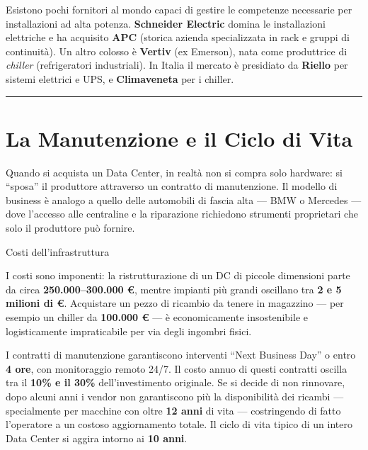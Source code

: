 \documentclass[
  italian,
  openany]{book}
\begin{document}
Esistono pochi fornitori al mondo capaci di gestire le competenze
necessarie per installazioni ad alta potenza. \textbf{Schneider
Electric} domina le installazioni elettriche e ha acquisito \textbf{APC}
(storica azienda specializzata in rack e gruppi di continuità). Un altro
colosso è \textbf{Vertiv} (ex Emerson), nata come produttrice di
\emph{chiller} (refrigeratori industriali). In Italia il mercato è
presidiato da \textbf{Riello} per sistemi elettrici e UPS, e
\textbf{Climaveneta} per i chiller.

\begin{center}\rule{0.5\linewidth}{0.5pt}\end{center}

\section{La Manutenzione e il Ciclo di
Vita}\label{la-manutenzione-e-il-ciclo-di-vita}

Quando si acquista un Data Center, in realtà non si compra solo
hardware: si ``sposa'' il produttore attraverso un contratto di
manutenzione. Il modello di business è analogo a quello delle automobili
di fascia alta --- BMW o Mercedes --- dove l'accesso alle centraline e
la riparazione richiedono strumenti proprietari che solo il produttore
può fornire.

\begin{calloutwarning}{Costi dell’infrastruttura}

I costi sono imponenti: la ristrutturazione di un DC di piccole
dimensioni parte da circa \textbf{250.000--300.000 €}, mentre impianti
più grandi oscillano tra \textbf{2 e 5 milioni di €}. Acquistare un
pezzo di ricambio da tenere in magazzino --- per esempio un chiller da
\textbf{100.000 €} --- è economicamente insostenibile e logisticamente
impraticabile per via degli ingombri fisici.

\end{calloutwarning}

I contratti di manutenzione garantiscono interventi ``Next Business
Day'' o entro \textbf{4 ore}, con monitoraggio remoto 24/7. Il costo
annuo di questi contratti oscilla tra il \textbf{10\% e il 30\%}
dell'investimento originale. Se si decide di non rinnovare, dopo alcuni
anni i vendor non garantiscono più la disponibilità dei ricambi ---
specialmente per macchine con oltre \textbf{12 anni} di vita ---
costringendo di fatto l'operatore a un costoso aggiornamento totale. Il
ciclo di vita tipico di un intero Data Center si aggira intorno ai
\textbf{10 anni}.
\end{document}
